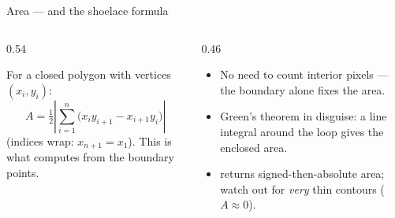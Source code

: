 \documentclass[10pt,aspectratio=169]{beamer}
\begin{document}
\begin{frame}{Area — and the shoelace formula}
  \begin{columns}[T]
    \begin{column}{0.54\textwidth}
      \begin{mathbox}
        For a closed polygon with vertices $(x_i,y_i)$:
        \[ A=\tfrac12\left|\sum_{i=1}^{n}\big(x_i y_{i+1}-x_{i+1}y_i\big)\right| \]
        (indices wrap: $x_{n+1}=x_1$). This is what  computes from the boundary points.
      \end{mathbox}
    \end{column}
    \begin{column}{0.46\textwidth}
      \begin{itemize}\scriptsize
        \item No need to count interior pixels — the boundary alone fixes the area.
        \item Green's theorem in disguise: a line integral around the loop gives the enclosed area.
        \item {} returns signed-then-absolute area; watch out for \emph{very} thin contours ($A\approx0$).
      \end{itemize}
    \end{column}
  \end{columns}
\end{frame}
\end{document}
